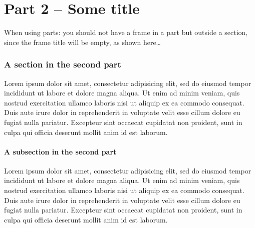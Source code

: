 \documentclass[9pt,english]{Beamer_PROMES}\uselanguage{English}\languagepath{English}
\begin{document}
\part{Part 2 -- Some title}
\begin{frame}

\color{red}When using parts: you should not have a frame in a part but outside a section, since the frame title will be empty, as shown here\dots

\end{frame}
\section{A section in the second part}
\begin{frame}

Lorem ipsum dolor sit amet, consectetur adipisicing elit, sed do eiusmod tempor incididunt ut labore et dolore magna aliqua. Ut enim ad minim veniam, quis nostrud exercitation ullamco laboris nisi ut aliquip ex ea commodo consequat. Duis aute irure dolor in reprehenderit in voluptate velit esse cillum dolore eu fugiat nulla pariatur. Excepteur sint occaecat cupidatat non proident, sunt in culpa qui officia deserunt mollit anim id est laborum.

\end{frame}
\subsection{A subsection in the second part}
\begin{frame}

Lorem ipsum dolor sit amet, consectetur adipisicing elit, sed do eiusmod tempor incididunt ut labore et dolore magna aliqua. Ut enim ad minim veniam, quis nostrud exercitation ullamco laboris nisi ut aliquip ex ea commodo consequat. Duis aute irure dolor in reprehenderit in voluptate velit esse cillum dolore eu fugiat nulla pariatur. Excepteur sint occaecat cupidatat non proident, sunt in culpa qui officia deserunt mollit anim id est laborum.

\end{frame}
\end{document}
